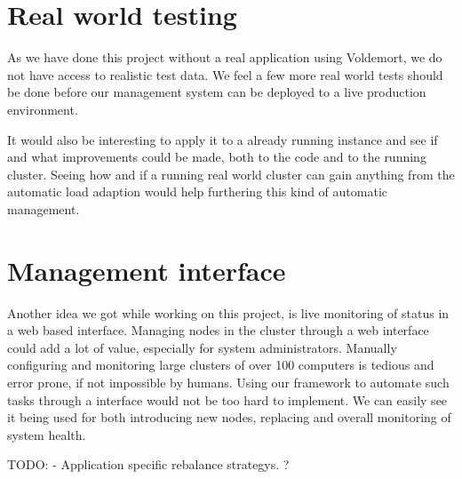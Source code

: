 \section{Real world testing}
As we have done this project without a real application using Voldemort, we do not have access to realistic test data. We feel a few more real world tests should be done before our management system can be deployed to a live production environment.

It would also be interesting to apply it to a already running instance and see if and what improvements could be made, both to the code and to the running cluster.
Seeing how and if a running real world cluster can gain anything from the automatic load adaption would help furthering this kind of automatic management.

\section{Management interface}
Another idea we got while working on this project, is live monitoring of status in a web based interface.
Managing nodes in the cluster through a web interface could add a lot of value, especially for system administrators.
Manually configuring and monitoring large clusters of over 100 computers is tedious and error prone, if not impossible by humans.
Using our framework to automate such tasks through a interface would not be too hard to implement.
We can easily see it being used for both introducing new nodes, replacing and overall monitoring of system health.


TODO: - Application specific rebalance strategys. ?
